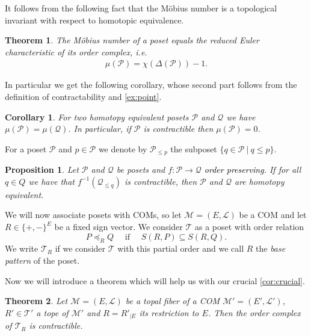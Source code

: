 \documentclass[12pt]{amsart}
\def\Pscr{\mathcal P}
\def\Qscr{\mathcal Q}
\def\Tscr{{\mathcal T}}
\def\Pscr{{\mathcal P}}
\def\M{{\mathcal M}}
\theoremstyle{plain}
\numberwithin{Lemma}{\DefaultNumberTheoremWithin}
\numberwithin{Claim}{\DefaultNumberTheoremWithin}
\newtheorem{Theorem}{Theorem}
\numberwithin{Theorem}{\DefaultNumberTheoremWithin}
\newtheorem{Corollary}{Corollary}
\numberwithin{Corollary}{\DefaultNumberTheoremWithin}
\newtheorem{Proposition}{Proposition}
\numberwithin{Proposition}{\DefaultNumberTheoremWithin}
\numberwithin{Conjecture}{\DefaultNumberTheoremWithin}
\numberwithin{Situation}{\DefaultNumberTheoremWithin}
\numberwithin{Note}{\DefaultNumberTheoremWithin}
\theoremstyle{definition}
\numberwithin{Definition}{\DefaultNumberTheoremWithin}
\theoremstyle{definition}
\numberwithin{Question}{\DefaultNumberTheoremWithin}
\theoremstyle{definition}
\numberwithin{Problem}{\DefaultNumberTheoremWithin}
\theoremstyle{remark} \newtheorem{Remark}{Remark}
\numberwithin{Remark}{\DefaultNumberTheoremWithin}
\theoremstyle{remark}
\numberwithin{Example}{\DefaultNumberTheoremWithin}
\numberwithin{Case}{Lemma}
\numberwithin{Step}{Lemma}
\newcommand{\new}[1]{\textcolor{black}{#1}}
\begin{document}
It follows from the following fact that the M\"obius number is a topological invariant with respect to homotopic equivalence.
\begin{Theorem}\cite[Philip Hall Theorem]{W} The M\"obius number of a poset equals the reduced Euler characteristic of its order complex, i.e.
\begin{align*}
\mu(\mathcal{P}) = \chi(\Delta(\mathcal{P}))-1.
\end{align*}
\end{Theorem}

In particular we get the following corollary, whose second part follows from the definition of contractability and \ref{ex:point}.

\begin{Corollary}
  \label{cor:moebius}
  For two homotopy equivalent posets $\mathcal{P}$ and $\mathcal{Q}$ we have
  $\mu(\mathcal{P}) = \mu(\mathcal{Q})$. In particular, if $\mathcal{P}$ is contractible then
  $\mu(\mathcal{P}) = 0$. 
\end{Corollary}

For a poset $\mathcal{P}$ and $p \in \mathcal{P}$ we denote by $\mathcal{P}_{\leq p}$ the subposet $\{ q \in \mathcal{P}~|~q \leq p\}$. 

\begin{Proposition}\cite[Quillen Fiber Lemma]{Q}
   \label{lem:quillen}
   Let $\Pscr$ and $\Qscr$ be posets and $f : \Pscr \rightarrow \Qscr$
   \new{order preserving}.  If for all $q \in Q$ we have that $f^{-1} (\Qscr_{\leq
     q})$ is contractible, then $\Pscr$ and $\Qscr$ are homotopy
   equivalent.
\end{Proposition}

 We will now associate posets with COMs, so let $\M=(E,\mathcal{L})$ be a COM and let
$R \in \{+,-\}^E$ be a fixed sign vector. We consider $\Tscr$ as a poset with order relation 
\[P \preceq_R Q\quad \text{ if }\quad S(R,P) \subseteq S(R,Q).\] We write $\Tscr_R$ if we consider
$\Tscr$ with this partial order and we call $R$ the \emph{base pattern} of the poset.
  

Now we will introduce a theorem which will help us with our crucial \new{\ref{cor:crucial}}.

\begin{Theorem}
  \label{thm:supertope}
Let $\M=(E,\mathcal{L})$ be a topal fiber of a COM $\M'=(E',\mathcal{L'})$, $R'\in \Tscr'$ a tope of $\M'$ and $R=R'_{|E}$ its restriction to $E$. Then the order complex of $\Tscr_{R}$ is contractible.

\end{Theorem}
\end{document}
